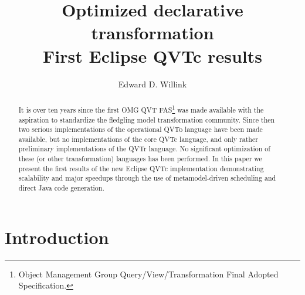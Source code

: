 \documentclass{llncs}
\begin{document}
%
\frontmatter          %
%
\pagestyle{headings}  %
%


%
\mainmatter              %
%
\title{Optimized declarative transformation\\First Eclipse QVTc results}
%
%
\author{Edward D. Willink}
%
%
%

\maketitle              %

\begin{abstract}
It is over ten years since the first OMG QVT FAS\footnote{Object Management Group Query/View/Transformation Final Adopted Specification.} was made available with the aspiration to standardize the fledgling model transformation community. Since then two serious implementations of the operational QVTo language have been made available, but no implementations of the core QVTc language, and only rather preliminary implementations of the QVTr language. No significant optimization of these (or other transformation) languages has been performed. In this paper we present the first results of the new Eclipse QVTc implementation demonstrating scalability and major speedups through the use of metamodel-driven scheduling and direct Java code generation.
\end{abstract}
%

\section{Introduction}
\end{document}
